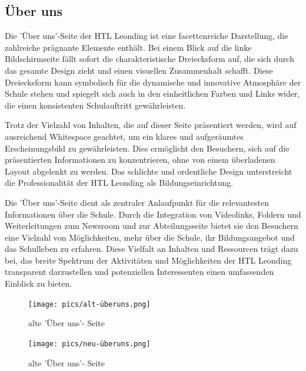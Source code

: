 \subsection{Über uns}

Die 'Über uns'-Seite der HTL Leonding ist eine facettenreiche Darstellung, die zahlreiche prägnante Elemente enthält. 
Bei einem Blick auf die linke Bildschirmseite fällt sofort die charakteristische Dreiecksform auf, 
die sich durch das gesamte Design zieht und einen visuellen Zusammenhalt schafft. Diese Dreiecksform kann symbolisch für die dynamische und 
innovative Atmosphäre der Schule stehen und spiegelt sich auch in den einheitlichen Farben und Links wider, die einen konsistenten Schulauftritt 
gewährleisten.

Trotz der Vielzahl von Inhalten, die auf dieser Seite präsentiert werden, wird auf ausreichend Whitespace geachtet, um ein klares und 
aufgeräumtes Erscheinungsbild zu gewährleisten. Dies ermöglicht den Besuchern, sich auf die präsentierten Informationen zu konzentrieren, 
ohne von einem überladenen Layout abgelenkt zu werden. Das schlichte und ordentliche Design unterstreicht die Professionalität  
der HTL Leonding als Bildungseinrichtung.

Die 'Über uns'-Seite dient als zentraler Anlaufpunkt für die relevantesten Informationen über die Schule. Durch die Integration von 
Videolinks, Foldern und Weiterleitungen zum Newsroom und zur Abteilungsseite bietet sie den Besuchern eine Vielzahl von Möglichkeiten, 
mehr über die Schule, ihr Bildungsangebot und das Schulleben zu erfahren. Diese Vielfalt an Inhalten und Ressourcen trägt dazu bei, das 
breite Spektrum der Aktivitäten und Möglichkeiten der HTL Leonding transparent darzustellen und potenziellen Interessenten einen umfassenden 
Einblick zu bieten.

\begin{figure}
   \begin{minipage}[b]{.4\linewidth} 
      \texttt{[image: pics/alt-überuns.png]}
      \caption{alte 'Über uns'- Seite}
      \label{fig:impl:alt:überuns}
   \end{minipage}
   \hspace{.05\linewidth}
   \begin{minipage}[b]{.4\linewidth}
      \texttt{[image: pics/neu-überuns.png]}
      \caption{alte 'Über uns'- Seite}
      \label{fig:impl:neu:überuns}
   \end{minipage}
\end{figure}

